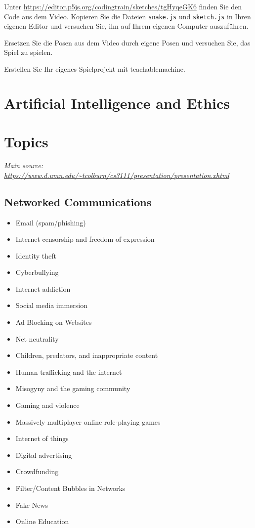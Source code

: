 \documentclass[12pt,a4paper]{report}
\begin{document}
\begin{ex}
    Unter \url{https://editor.p5js.org/codingtrain/sketches/tgHyqeGK6} finden Sie den Code aus dem Video. Kopieren Sie die Dateien \verb|snake.js| und \verb|sketch.js| in Ihren eigenen Editor und versuchen Sie, ihn auf Ihrem eigenen Computer auszuführen.
    
\end{ex}

\begin{ex}
     Ersetzen Sie die Posen aus dem Video durch eigene Posen und versuchen Sie, das Spiel zu spielen.
\end{ex}

\begin{ex}
    Erstellen Sie Ihr eigenes Spielprojekt mit teachablemachine.
\end{ex}


\newpage



\section*{Artificial Intelligence and Ethics}





\section*{Topics}
\emph{Main source: \url{https://www.d.umn.edu/~tcolburn/cs3111/presentation/presentation.xhtml}}
\subsection*{Networked Communications}
\begin{itemize}
\item Email (spam/phishing)
\item Internet censorship and freedom of expression
\item Identity theft
\item Cyberbullying
\item Internet addiction
\item Social media immersion
\item Ad Blocking on Websites
\item Net neutrality
\item Children, predators, and inappropriate content
\item Human trafficking and the internet
\item Misogyny and the gaming community
\item Gaming and violence
\item Massively multiplayer online role-playing games
\item Internet of things
\item Digital advertising
\item Crowdfunding
\item Filter/Content Bubbles in Networks
\item Fake News
\item Online Education
\end{itemize}
\end{document}
